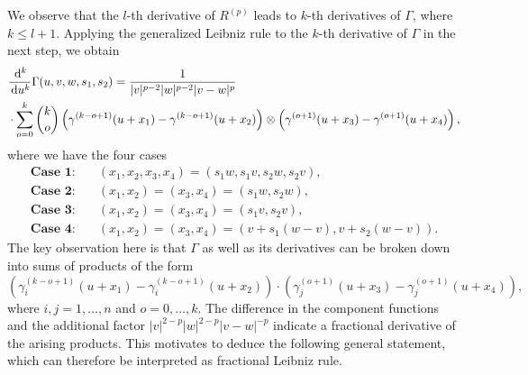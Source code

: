 We observe that the $l$-th derivative of $R^{(p)}$ leads to $k$-th derivatives of $\Gamma$, where $k\leq l+1$. Applying the generalized Leibniz rule to the $ k$-th derivative of $\Gamma$ in the next step, we obtain
\[
\begin{split}
& \frac {\,\mathrm{d}^{k}} {\,\mathrm{d} u^{k}} \Gamma(u,v,w,s_1,s_2)  = \frac{1}{|v|^{p-2}|w|^{p-2}|v-w|^{p}} \\
& \cdot  \sum_{o=0}^{k} \binom{k}{o} \left(\gamma^{(k-o+1)}(u+x_1) - \gamma^{(k-o+1)}(u+x_2) \right) \otimes \left( \gamma^{(o+1)}(u+x_3) - \gamma^{(o+1)}(u+x_4) \right),
\end{split}
\]
where we have the four cases 
\[
\begin{split}
\textbf{Case 1:} & \quad (x_1,x_2,x_3,x_4) =(s_1w,s_1v, s_2w, s_2v), \\
\textbf{Case 2:} & \quad (x_1,x_2)=(x_3,x_4) = (s_1w,s_2w), \\
\textbf{Case 3:} & \quad (x_1,x_2)=(x_3,x_4) = (s_1v, s_2v), \\
\textbf{Case 4:} & \quad (x_1,x_2)=(x_3,x_4) = (v+s_1(w-v), v+s_2(w-v)).
\end{split}
\]
The key observation here is that $\Gamma$ as well as its derivatives can be broken down into sums of products of the form
\[
	\left(\gamma_i^{(k-o+1)}(u+x_1) - \gamma_i^{(k-o+1)}(u+x_2) \right) \cdot \left( \gamma_j^{(o+1)}(u+x_3) - \gamma_j^{(o+1)}(u+x_4) \right),
\]
where $i,j=1,\ldots,n$ and $o=0,\ldots, k$. The difference in the component functions and the additional factor $|v|^{2-p}|w|^{2-p}|v-w|^{-p}$ indicate a fractional derivative of the arising products. This motivates to deduce the following general statement, which can therefore be interpreted as fractional Leibniz rule.

